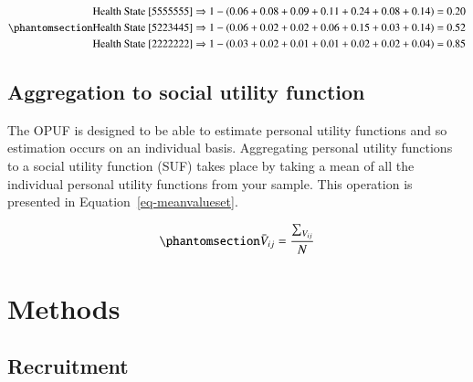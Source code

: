 \documentclass[
  number,
  preprint]{elsarticle}
\begin{document}
\begin{equation}\phantomsection\label{eq-HS123}{
\begin{aligned}
\text{Health State [5555555]} & \Rightarrow 1 - (0.06 + 0.08 + 0.09 + 0.11 + 0.24 + 0.08 + 0.14) = 0.20 \\
\text{Health State [5223445]} & \Rightarrow 1 - (0.06 + 0.02 + 0.02 + 0.06 + 0.15 + 0.03 + 0.14) = 0.52 \\
\text{Health State [2222222]} & \Rightarrow 1 - (0.03 + 0.02 + 0.01 + 0.01 + 0.02 + 0.02 + 0.04) = 0.85
\end{aligned}
}\end{equation}

\subsection{Aggregation to social utility
function}\label{aggregation-to-social-utility-function}

The OPUF is designed to be able to estimate personal utility functions
and so estimation occurs on an individual basis. Aggregating personal
utility functions to a social utility function (SUF) takes place by
taking a mean of all the individual personal utility functions from your
sample. This operation is presented in Equation~\ref{eq-meanvalueset}.

\begin{equation}\phantomsection\label{eq-meanvalueset}{
\bar{V}_{{ij}} = \frac{\sum_{V_{{ij}}}^{}}{N}
}\end{equation}

\section{Methods}\label{methods}

\subsection{Recruitment}\label{recruitment}
\end{document}
